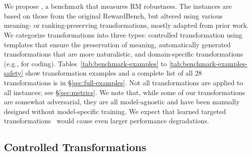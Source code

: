 \section{\benchmark}



We propose \benchmark, a benchmark that measures RM robustness.
The instances are based on those from the original RewardBench, but altered using various meaning- or ranking-preserving transformations, mostly adapted from prior work.
We categorize \benchmark transformations into three types: controlled transformation using templates that ensure the preservation of meaning, automatically generated transformations that are more naturalistic, and domain-specific transformations (e.g., for coding).
Tables~\ref{tab:benchmark-examples} to \ref{tab:benchmark-examples-safety} show transformation examples and a complete list of all 28 transformations is in \S\ref{sec:full-examples}.
Not all transformations are applied to all instances; see \S\ref{sec:metrics}.
We note that, while some of our transformations are somewhat adversarial, they are all model-agnostic and have been manually designed without model-specific training. We expect that learned targeted transformations~ would cause even larger performance degradations.


\subsection{Controlled Transformations} \label{sec:controlled-transformations}

